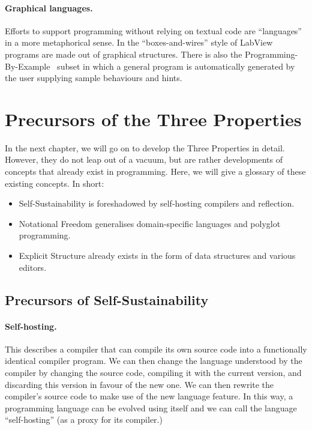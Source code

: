 \paragraph{Graphical languages.}

Efforts to support programming without relying on textual code are
``languages'' in a more metaphorical sense. In the ``boxes-and-wires''
style of LabView~\cite{LabView} programs are made out of graphical
structures. There is also the Programming-By-Example~\cite{YWIMC} subset
in which a general program is automatically generated by the user
supplying sample behaviours and hints.

\hypertarget{precursors-of-the-three-properties}{%
\section{Precursors of the Three
Properties}\label{precursors-of-the-three-properties}}

In the next chapter, we will go on to develop the Three Properties in
detail. However, they do not leap out of a vacuum, but are rather
developments of concepts that already exist in programming. Here, we
will give a glossary of these existing concepts. In short:

\begin{itemize}
\tightlist
\item
  Self-Sustainability is foreshadowed by self-hosting compilers and
  reflection.
\item
  Notational Freedom generalises domain-specific languages and polyglot
  programming.
\item
  Explicit Structure already exists in the form of data structures and
  various editors.
\end{itemize}

\hypertarget{precursors-of-self-sustainability}{%
\subsection{Precursors of
Self-Sustainability}\label{precursors-of-self-sustainability}}

\paragraph{Self-hosting.}

This describes a compiler that can compile its own source code into a
functionally identical compiler program. We can then change the language
understood by the compiler by changing the source code, compiling it
with the current version, and discarding this version in favour of the
new one. We can then rewrite the compiler's source code to make use of
the new language feature. In this way, a programming language can be
evolved using itself and we can call the language ``self-hosting'' (as a
proxy for its compiler.)

